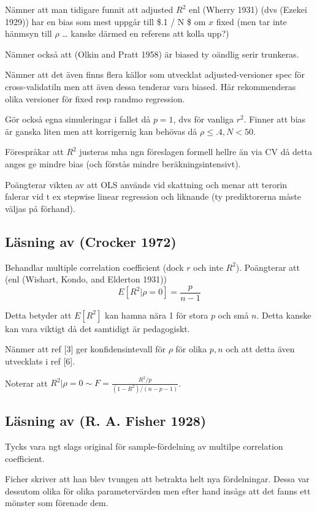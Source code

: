 \documentclass[]{article}
\begin{document}
Nämner att man tidigare funnit att adjusted \(R^2\) enl (Wherry 1931)
(dvs (Ezekei 1929)) har en bias som mest uppgår till \$.1 / N \$ om
\(x\) fixed (men tar inte hänmsyn till \(\rho\) \ldots{} kanske därmed
en referens att kolla upp?)

Nämner också att (Olkin and Pratt 1958) är biased ty oändlig serir
trunkeras.

Nämner att det även finns flera källor som utvecklat adjusted-versioner
spec för cross-validatiln men att även dessa tenderar vara biased. Här
rekommenderas olika versioner för fixed resp randmo regression.

Gör också egna simuleringar i fallet då \(p = 1\), dvs för vanliga
\(r^2\). Finner att bias är ganska liten men att korrigernig kan behövas
då \(\rho \leq .4, N < 50\).

Förespråkar att \(R^2\) justeras mha ngn föreslagen formell hellre än
via CV då detta anges ge mindre bias (och förstås mindre
beräkningsintensivt).

Poängterar vikten av att OLS används vid skattning och menar att terorin
falerar vid t ex stepwise linear regression och liknande (ty
prediktorerna måste väljas på förhand).

\subsection{Läsning av (Crocker 1972)}\label{lasning-av-crocker1972}

Behandlar multiple correlation coefficient (dock \(r\) och inte
\(R^2\)). Poängterar att (enl (Wishart, Kondo, and Elderton 1931))
\[E[R^2|\rho = 0] = \frac{p}{n-1}\]

Detta betyder att \(E[R^2]\) kan hamna nära 1 för stora \(p\) och små
\(n\). Detta kanske kan vara viktigt då det samtidigt är pedagogiskt.

Nänmer att ref {[}3{]} ger konfidensintevall för \(\rho\) för olika
\(p, n\) och att detta även utvecklats i ref {[}6{]}.

Noterar att \(R^2|\rho = 0 \sim F = \frac{R^2/p}{(1-R^2)/(n-p-1)}\).

\subsection{Läsning av (R. A. Fisher 1928)}\label{lasning-av-fisher1928}

Tycks vara ngt slags original för sample-fördelning av multilpe
correlation coefficient.

Ficher skriver att han blev tvungen att betrakta helt nya fördelningar.
Dessa var dessutom olika för olika parametervärden men efter hand insågs
att det fanns ett mönster som förenade dem.
\end{document}
